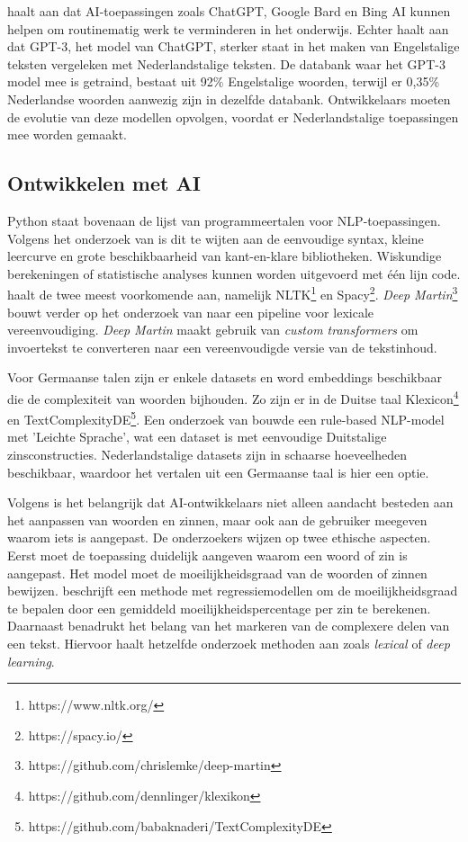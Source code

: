 \textcite{Verhoeven2023} haalt aan dat AI-toepassingen zoals ChatGPT, Google Bard en Bing AI kunnen helpen om routinematig werk te verminderen in het onderwijs. Echter haalt \textcite{Deckmyn2021} aan dat GPT-3, het model van ChatGPT, sterker staat in het maken van Engelstalige teksten vergeleken met Nederlandstalige teksten. De databank waar het GPT-3 model mee is getraind, bestaat uit 92\% Engelstalige woorden, terwijl er 0,35\% Nederlandse woorden aanwezig zijn in dezelfde databank. Ontwikkelaars moeten de evolutie van deze modellen opvolgen, voordat er Nederlandstalige toepassingen mee worden gemaakt.



\subsection{Ontwikkelen met AI}

Python staat bovenaan de lijst van programmeertalen voor NLP-toepassingen. Volgens het onderzoek van \textcite{Thangarajah2019} is dit te wijten aan de eenvoudige syntax, kleine leercurve en grote beschikbaarheid van kant-en-klare bibliotheken. Wiskundige berekeningen of statistische analyses kunnen worden uitgevoerd met één lijn code. \textcite{Malik2022} haalt de twee meest voorkomende aan, namelijk NLTK\footnote{https://www.nltk.org/} en Spacy\footnote{https://spacy.io/}. \textit{Deep Martin}\footnote{https://github.com/chrislemke/deep-martin} bouwt verder op het onderzoek van \textcite{Shardlow2014} naar een pipeline voor lexicale vereenvoudiging. \textit{Deep Martin} maakt gebruik van \textit{custom transformers} om invoertekst te converteren naar een vereenvoudigde versie van de tekstinhoud.

Voor Germaanse talen zijn er enkele datasets en word embeddings beschikbaar die de complexiteit van woorden bijhouden. Zo zijn er in de Duitse taal Klexicon\footnote{https://github.com/dennlinger/klexikon} en TextComplexityDE\footnote{https://github.com/babaknaderi/TextComplexityDE}. Een onderzoek van \textcite{Suter2016} bouwde een rule-based NLP-model met 'Leichte Sprache', wat een dataset is met eenvoudige Duitstalige zinsconstructies. Nederlandstalige datasets zijn in schaarse hoeveelheden beschikbaar, waardoor het vertalen uit een Germaanse taal is hier een optie.

Volgens \textcite{Garbacea2021} is het belangrijk dat AI-ontwikkelaars niet alleen aandacht besteden aan het aanpassen van woorden en zinnen, maar ook aan de gebruiker meegeven waarom iets is aangepast. De onderzoekers wijzen op twee ethische aspecten. Eerst moet de toepassing duidelijk aangeven waarom een woord of zin is aangepast. Het model moet de moeilijkheidsgraad van de woorden of zinnen bewijzen. \textcite{Iavarone2021} beschrijft een methode met regressiemodellen om de moeilijkheidsgraad te bepalen door een gemiddeld moeilijkheidspercentage per zin te berekenen. Daarnaast benadrukt \textcite{Garbacea2021} het belang van het markeren van de complexere delen van een tekst. Hiervoor haalt hetzelfde onderzoek methoden aan zoals \textit{lexical} of \textit{deep learning}.

